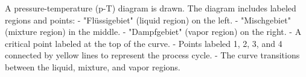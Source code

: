 A pressure-temperature (p-T) diagram is drawn. The diagram includes labeled regions and points:  
- "Flüssigebiet" (liquid region) on the left.  
- "Mischgebiet" (mixture region) in the middle.  
- "Dampfgebiet" (vapor region) on the right.  
- A critical point labeled at the top of the curve.  
- Points labeled 1, 2, 3, and 4 connected by yellow lines to represent the process cycle.  
- The curve transitions between the liquid, mixture, and vapor regions.